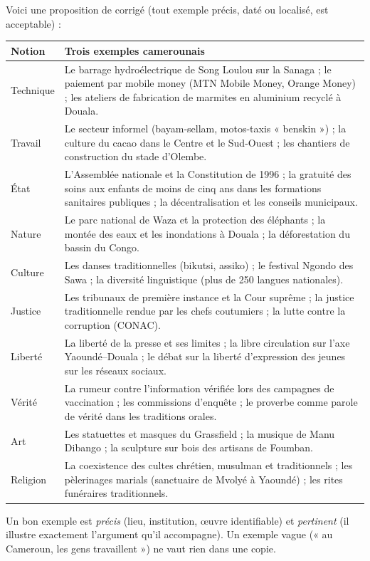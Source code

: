 \documentclass[11pt]{article}
\begin{document}
\begin{corrige}
Voici une proposition de corrigé (tout exemple précis, daté ou localisé, est acceptable) :
\begin{center}
\begin{tabularx}{\linewidth}{|l|X|}
\hline
\rowcolor{popblueL} \textbf{Notion} & \textbf{Trois exemples camerounais} \\
\hline
Technique & Le barrage hydroélectrique de Song Loulou sur la Sanaga ; le paiement par mobile money (MTN Mobile Money, Orange Money) ; les ateliers de fabrication de marmites en aluminium recyclé à Douala. \\
\hline
Travail & Le secteur informel (bayam-sellam, motos-taxis « benskin ») ; la culture du cacao dans le Centre et le Sud-Ouest ; les chantiers de construction du stade d'Olembe. \\
\hline
État & L'Assemblée nationale et la Constitution de 1996 ; la gratuité des soins aux enfants de moins de cinq ans dans les formations sanitaires publiques ; la décentralisation et les conseils municipaux. \\
\hline
Nature & Le parc national de Waza et la protection des éléphants ; la montée des eaux et les inondations à Douala ; la déforestation du bassin du Congo. \\
\hline
Culture & Les danses traditionnelles (bikutsi, assiko) ; le festival Ngondo des Sawa ; la diversité linguistique (plus de 250 langues nationales). \\
\hline
Justice & Les tribunaux de première instance et la Cour suprême ; la justice traditionnelle rendue par les chefs coutumiers ; la lutte contre la corruption (CONAC). \\
\hline
Liberté & La liberté de la presse et ses limites ; la libre circulation sur l'axe Yaoundé--Douala ; le débat sur la liberté d'expression des jeunes sur les réseaux sociaux. \\
\hline
Vérité & La rumeur contre l'information vérifiée lors des campagnes de vaccination ; les commissions d'enquête ; le proverbe comme parole de vérité dans les traditions orales. \\
\hline
Art & Les statuettes et masques du Grassfield ; la musique de Manu Dibango ; la sculpture sur bois des artisans de Foumban. \\
\hline
Religion & La coexistence des cultes chrétien, musulman et traditionnels ; les pèlerinages marials (sanctuaire de Mvolyé à Yaoundé) ; les rites funéraires traditionnels. \\
\hline
\end{tabularx}
\end{center}
\begin{attention}
Un bon exemple est \emph{précis} (lieu, institution, œuvre identifiable) et \emph{pertinent} (il illustre exactement l'argument qu'il accompagne). Un exemple vague (« au Cameroun, les gens travaillent ») ne vaut rien dans une copie.
\end{attention}
\end{corrige}
\end{document}

